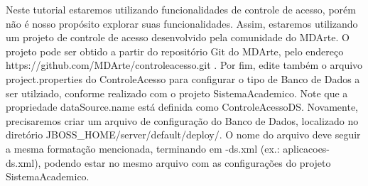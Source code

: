Neste tutorial estaremos utilizando funcionalidades de controle de acesso, porém não é
nosso propósito explorar suas funcionalidades. Assim, estaremos utilizando um projeto de controle
de acesso desenvolvido pela comunidade do MDArte.
O projeto pode ser obtido a partir do repositório Git do MDArte,
pelo endereço https://github.com/MDArte/controleacesso.git . Por fim, edite também o
arquivo project.properties do ControleAcesso para configurar o tipo de Banco de Dados a ser
utilziado, conforme realizado com o projeto SistemaAcademico. Note que a propriedade
dataSource.name está definida como ControleAcessoDS.
Novamente, precisaremos criar um arquivo de configuração do Banco de Dados, localizado
no diretório JBOSS\_HOME/server/default/deploy/. O nome do arquivo deve seguir a
mesma formatação mencionada, terminando em -ds.xml (ex.: aplicacoes-ds.xml), podendo estar no mesmo
arquivo com as configurações do projeto SistemaAcademico.